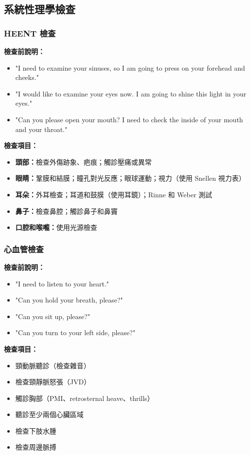 \documentclass[12pt,a4paper]{article}
\begin{document}
\subsection{系統性理學檢查}

\subsubsection{HEENT 檢查}

\textbf{檢查前說明：}
\begin{itemize}
    \item "I need to examine your sinuses, so I am going to press on your forehead and cheeks."
    \item "I would like to examine your eyes now. I am going to shine this light in your eyes."
    \item "Can you please open your mouth? I need to check the inside of your mouth and your throat."
\end{itemize}

\textbf{檢查項目：}
\begin{itemize}
    \item \textbf{頭部：}檢查外傷跡象、疤痕；觸診壓痛或異常
    \item \textbf{眼睛：}鞏膜和結膜；瞳孔對光反應；眼球運動；視力（使用 Snellen 視力表）
    \item \textbf{耳朵：}外耳檢查；耳道和鼓膜（使用耳鏡）；Rinne 和 Weber 測試
    \item \textbf{鼻子：}檢查鼻腔；觸診鼻子和鼻竇
    \item \textbf{口腔和喉嚨：}使用光源檢查
\end{itemize}

\subsubsection{心血管檢查}

\textbf{檢查前說明：}
\begin{itemize}
    \item "I need to listen to your heart."
    \item "Can you hold your breath, please?"
    \item "Can you sit up, please?"
    \item "Can you turn to your left side, please?"
\end{itemize}

\textbf{檢查項目：}
\begin{itemize}
    \item 頸動脈聽診（檢查雜音）
    \item 檢查頸靜脈怒張（JVD）
    \item 觸診胸部（PMI、retrosternal heave、thrills）
    \item 聽診至少兩個心臟區域
    \item 檢查下肢水腫
    \item 檢查周邊脈搏
\end{itemize}
\end{document}
